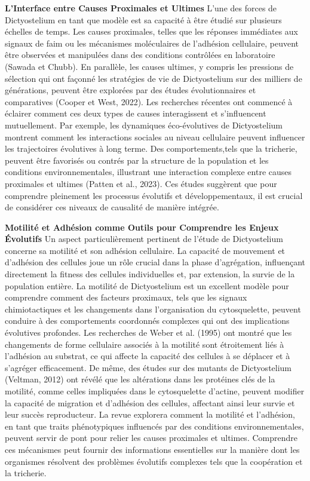 \documentclass[twocolumn,10pt]{article} %
\begin{document}
\textbf{L'Interface entre Causes Proximales et Ultimes}
L'une des forces de Dictyostelium en tant que modèle est sa capacité à être étudié sur plusieurs échelles de temps. 
Les causes proximales, telles que les réponses immédiates aux signaux de faim ou les mécanismes moléculaires de l’adhésion 
cellulaire, peuvent être observées et manipulées dans des conditions contrôlées en laboratoire (Sawada et Chubb). En parallèle,
 les causes ultimes, y compris les pressions de sélection qui ont façonné les stratégies de vie de Dictyostelium sur des milliers
  de générations, peuvent être explorées par des études évolutionnaires et comparatives (Cooper et West, 2022).
Les recherches récentes ont commencé à éclairer comment ces deux types de causes interagissent et s'influencent mutuellement.
 Par exemple, les dynamiques éco-évolutives de Dictyostelium montrent comment les interactions sociales au niveau cellulaire
  peuvent influencer les trajectoires évolutives à long terme. Des comportements,tels que la tricherie, peuvent être favorisés
   ou contrés par la structure de la population et les conditions environnementales, illustrant une interaction complexe entre
    causes proximales et ultimes (Patten et al., 2023). Ces études suggèrent que pour comprendre pleinement les processus évolutifs
     et développementaux, il est crucial de considérer ces niveaux de causalité de manière intégrée.

\textbf{Motilité et Adhésion comme Outils pour Comprendre les Enjeux Évolutifs}
Un aspect particulièrement pertinent de l'étude de Dictyostelium concerne sa motilité et son adhésion cellulaire. 
La capacité de mouvement et d'adhésion des cellules joue un rôle crucial dans la phase d'agrégation, influençant directement 
la fitness des cellules individuelles et, par extension, la survie de la population entière. La motilité de Dictyostelium est 
un excellent modèle pour comprendre comment des facteurs proximaux, tels que les signaux chimiotactiques et les changements dans 
l'organisation du cytosquelette, peuvent conduire à des comportements coordonnés complexes qui ont des implications évolutives
 profondes. Les recherches de Weber et al. (1995) ont montré que les changements de forme cellulaire associés à la motilité sont
  étroitement liés à l'adhésion au substrat, ce qui affecte la capacité des cellules à se déplacer et à s'agréger efficacement. 
  De même, des études sur des mutants de Dictyostelium (Veltman, 2012) ont révélé que les altérations dans les protéines clés de 
  la motilité, comme celles impliquées dans le cytosquelette d'actine, peuvent modifier la capacité de migration et d'adhésion des 
  cellules, affectant ainsi leur survie et leur succès reproducteur.
La revue explorera comment la motilité et l'adhésion, en tant que traits phénotypiques influencés par des conditions 
environnementales, peuvent servir de pont pour relier les causes proximales et ultimes. Comprendre ces mécanismes peut fournir 
des informations essentielles sur la manière dont les organismes résolvent des problèmes évolutifs complexes tels que la coopération 
et la tricherie.
\end{document}
